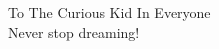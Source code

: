 \begin{dedication}
{\large{To The Curious Kid In Everyone}}\\[4mm]
Never stop dreaming!
\end{dedication}


